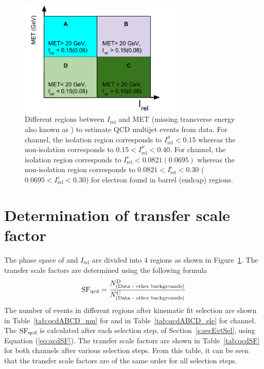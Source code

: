 \begin{figure}
\begin{center}
\includegraphics[width=0.70\textwidth]{Image/abcd_region.pdf}
\caption{Different regions between $I_{\text{rel}}$ and MET (missing transverse energy also known as
	\MET) to estimate QCD multijet events from data. For \mujets channel, the isolation region 
	corresponds to $I_{\text{rel}}^{\mu} < 0.15$ whereas the non-isolation corresponds to 
    $0.15 < I_{\text{rel}}^{\mu} < 0.40$. For \ejets channel, the isolation region 
    corresponds to $I_{\text{rel}}^{e} < 0.0821 (0.0695)$ whereas the non-isolation 
    region corresponds to $0.0821 <I_{\text{rel}}^{e} < 0.30$ 
    ($0.0695 <I_{\text{rel}}^{e} < 0.30$) for electron found in barrel (endcap) regions.
}
\label{fig:abcd}
\end{center}
\end{figure}


\section{Determination of transfer scale factor}
The phase space of \MET and $I_{\text{rel}}$ are divided into 4 regions as shown in 
Figure~\ref{fig:abcd}. The transfer scale factors are determined using the following formula 
\begin{equation}
    {\rm{SF}_{\text{qcd}}} = \frac{N_{\rm{(Data - other backgrounds)}}^\text{D}}{N_{\rm {(Data - other backgrounds)}}^\text{C}}
\label{eq:qcdSF}
\end{equation}
The number of events in different regions after kinematic fit selection are shown in Table~\ref{tab:qcdABCD_mu} for \mujets and in Table~\ref{tab:qcdABCD_ele} for \ejets channel. The $\rm{SF}_{\text{qcd}}$
is calculated after each selection step, of Section~\ref{s:secEvtSel}, 
using Equation (\ref{eq:qcdSF}). The transfer scale factors are shown in Table~\ref{tab:qcdSF} for both 
channels after various selection steps. From this table, it can be seen that the transfer scale 
factors are of the same order for all selection steps.

